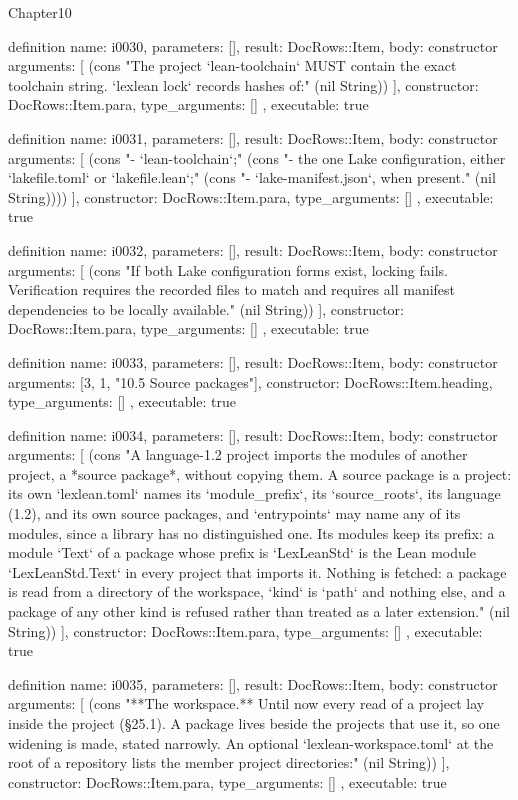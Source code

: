 \begin{lexlean}{Chapter10}
\begin{semanticmodule}
definition{
  name: i0030,
  parameters: [],
  result: DocRows::Item,
  body: constructor{
    arguments: [
      (cons "The project `lean-toolchain` MUST contain the exact toolchain string. `lexlean lock` records hashes of:" (nil String))
    ],
    constructor: DocRows::Item.para,
    type_arguments: []
  },
  executable: true
}

definition{
  name: i0031,
  parameters: [],
  result: DocRows::Item,
  body: constructor{
    arguments: [
      (cons "- `lean-toolchain`;" (cons "- the one Lake configuration, either `lakefile.toml` or `lakefile.lean`;" (cons "- `lake-manifest.json`, when present." (nil String))))
    ],
    constructor: DocRows::Item.para,
    type_arguments: []
  },
  executable: true
}

definition{
  name: i0032,
  parameters: [],
  result: DocRows::Item,
  body: constructor{
    arguments: [
      (cons "If both Lake configuration forms exist, locking fails. Verification requires the recorded files to match and requires all manifest dependencies to be locally available." (nil String))
    ],
    constructor: DocRows::Item.para,
    type_arguments: []
  },
  executable: true
}

definition{
  name: i0033,
  parameters: [],
  result: DocRows::Item,
  body: constructor{
    arguments: [3, 1, "10.5 Source packages"],
    constructor: DocRows::Item.heading,
    type_arguments: []
  },
  executable: true
}

definition{
  name: i0034,
  parameters: [],
  result: DocRows::Item,
  body: constructor{
    arguments: [
      (cons "A language-1.2 project imports the modules of another project, a *source package*, without copying them. A source package is a project: its own `lexlean.toml` names its `module_prefix`, its `source_roots`, its language (1.2), and its own source packages, and `entrypoints` may name any of its modules, since a library has no distinguished one. Its modules keep its prefix: a module `Text` of a package whose prefix is `LexLeanStd` is the Lean module `LexLeanStd.Text` in every project that imports it. Nothing is fetched: a package is read from a directory of the workspace, `kind` is `path` and nothing else, and a package of any other kind is refused rather than treated as a later extension." (nil String))
    ],
    constructor: DocRows::Item.para,
    type_arguments: []
  },
  executable: true
}

definition{
  name: i0035,
  parameters: [],
  result: DocRows::Item,
  body: constructor{
    arguments: [
      (cons "**The workspace.** Until now every read of a project lay inside the project (§25.1). A package lives beside the projects that use it, so one widening is made, stated narrowly. An optional `lexlean-workspace.toml` at the root of a repository lists the member project directories:" (nil String))
    ],
    constructor: DocRows::Item.para,
    type_arguments: []
  },
  executable: true
}


\end{semanticmodule}
\end{lexlean}
